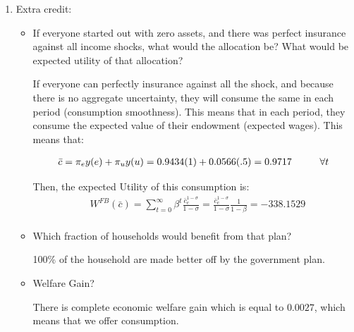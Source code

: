 \documentclass[12pt]{article}%
\newcommand\tab[1][1cm]{\hspace*{#1}}
\begin{document}
\begin{enumerate}
	\item Extra credit:
	
	\begin{itemize}
		\item If everyone started out with zero assets, and there was perfect insurance against all income shocks, what would the allocation be? What would be expected utility of that allocation?
		
		\vspace{1mm}
		
		If everyone can perfectly insurance against all the shock, and because there is no aggregate uncertainty, they will consume the same in each period (consumption smoothness). This means that in each period, they consume the expected value of their endowment (expected wages). This means that:
		
			\begin{align*}
		\bar{c}=\pi_{e}y(e)+\pi_{u}y(u)={0.9434}(1)+{0.0566}(.5)=0.9717  \tab  \forall t \notag \\ 				
		\end{align*}
		
		Then, the expected Utility of this consumption is: 
				\begin{align*}
		&W^{FB}(\bar{c})={\sum}_{t=0}^{\infty}\beta^{t}\frac{\bar{c}_e^{1-\sigma}}{1-\sigma}=\frac{\bar{c}_e^{1-\sigma}}{1-\sigma}\frac{1}{1-\beta}= -338.1529\\		 
		\end{align*}
		
		\vspace{1mm}
		
		\item Which fraction of households would benefit from that plan?
			
		\vspace{1mm}
		
		100\% of the household are made better off by the government plan.	
		
		
		\item Welfare Gain?
			\vspace{1mm}
		
	 There is complete economic welfare gain which is equal to $0.0027$, which means that we offer consumption.
		
		
	\end{itemize}
	
\end{enumerate}

\strut

\onehalfspacing
\end{document}
